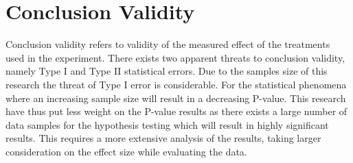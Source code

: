 \section{Conclusion Validity}
Conclusion validity refers to validity of the measured effect of the treatments used in the experiment. There exists two apparent threats to conclusion validity, namely Type I and Type II statistical errors. Due to the samples size of this research the threat of Type I error is considerable. For the statistical phenomena where an increasing sample size will result in a decreasing P-value. This research have thus put less weight on the P-value results as there exists a large number of data samples for the hypothesis testing \cite{kampenes2007systematic} which will result in highly significant results. This requires a more extensive analysis of the results, taking larger consideration on the effect size while evaluating the data.











